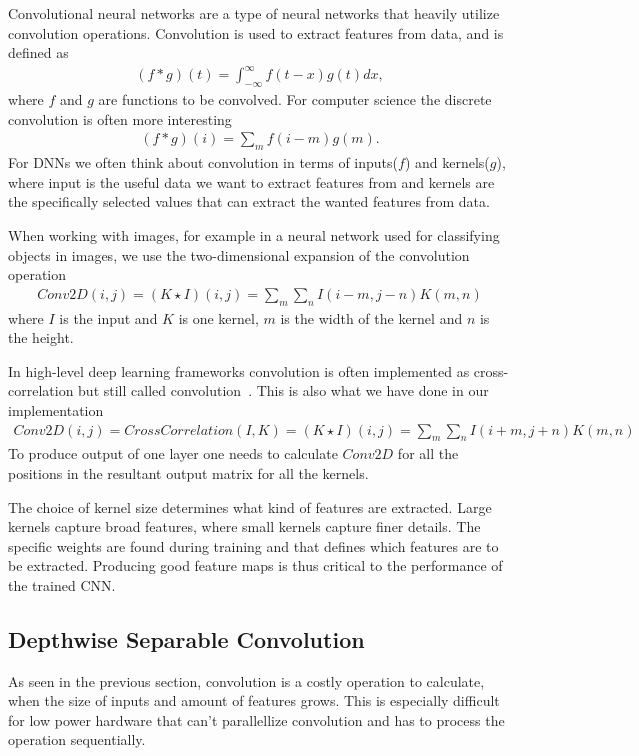 \documentclass[12pt,a4paper,english
]{tunithesis}
\begin{document}
Convolutional neural networks are a type of neural networks that heavily utilize convolution operations. Convolution is used to extract features from data, and is defined as
\begin{align}
(f \ast g)(t) = \int_{-\infty}^{\infty}f(t-x)g(t)dx,
\end{align}
where $f$ and $g$ are functions to be convolved. For computer science the discrete convolution is often more interesting
\begin{align}
(f \ast g)(i) = \sum_{m}f(i-m)g(m).
\end{align}
For DNNs we often think about convolution in terms of inputs($f$) and kernels($g$), where input is the useful data we want to extract features from and kernels are the specifically selected values that can extract the wanted features from data.

When working with images, for example in a neural network used for classifying objects in images, we use the two-dimensional expansion of the convolution operation
\begin{align}
Conv2D(i, j) = (K \star I)(i,j) = \sum_{m}\sum_{n}I(i-m,j-n)K(m, n)
\end{align}
where $I$ is the input and $K$ is one kernel, $m$ is the width of the kernel and $n$ is the height.

In high-level deep learning frameworks convolution is often implemented as cross-correlation but still called convolution~\cite{DeepLearningBook,paszke_pytorch_2019,tensorflow2015-whitepaper}. This is also what we have done in our implementation
\begin{align}
Conv2D(i,j) = CrossCorrelation(I, K) = (K \star I)(i,j) = \sum_{m}\sum_{n}I(i+m,j+n)K(m, n)
\end{align}
To produce output of one layer one needs to calculate $Conv2D$ for all the positions in the resultant output matrix for all the kernels.

The choice of kernel size determines what kind of features are extracted. Large kernels capture broad features, where small kernels capture finer details.
The specific weights are found during training and that defines which features are to be extracted. Producing good feature maps is thus critical to the performance of the trained CNN.

\subsection{Depthwise Separable Convolution}
As seen in the previous section, convolution is a costly operation to calculate, when the size of inputs and amount of features grows. This is especially difficult for low power hardware that can't parallellize convolution and has to process the operation sequentially.
\end{document}
